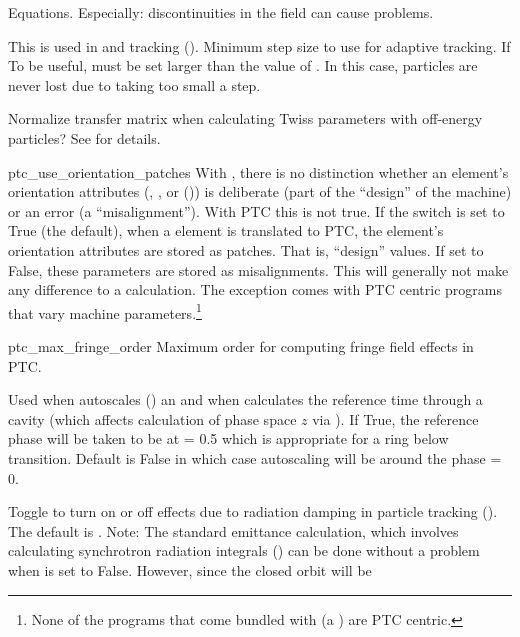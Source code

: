 {\begin{description}
Equations. Especially: discontinuities in the field can cause problems.
%
\item[\vn{min_ds_adaptive_tracking}] \Newline
This is used in  and  tracking (). Minimum step
size to use for adaptive tracking. If To be useful,  must be set
larger than the value of . In this case, particles are never lost
due to taking too small a step.
%
\item[\vn{normalize_twiss}] \Newline
Normalize transfer matrix when calculating Twiss parameters with off-energy particles?
See  for details.
%
\item{ptc_use_orientation_patches} \Newline
With \bmad, there is no distinction whether an element's orientation attributes (,
, or  ()) is deliberate (part of the ``design'' of the machine)
or an error (a ``misalignment'').  With PTC this is not true. If the 
switch is set to True (the default), when a \bmad element is translated to PTC,
the element's orientation attributes are stored as patches. That is, ``design'' values.
If set to False, these parameters are stored as misalignments. This will generally not make any
difference to a calculation. The exception comes with PTC centric programs that vary machine
parameters.\footnote
  {
None of the programs that come bundled with \bmad (a \bmad {}) are
PTC centric.
  }
%
\item{ptc_max_fringe_order} \Newline
Maximum order for computing fringe field effects in PTC. 
%
\item[\vn{rf_phase_below_transition_ref}] \Newline
Used when \bmad autoscales () an  and when \bmad calculates the
reference time through a cavity (which affects calculation of phase space $z$ via ).  If
True, the reference phase will be taken to be at  = 0.5 which is appropriate for a ring
below transition. Default is False in which case autoscaling will be around the phase  = 0.
%
\item[\vn{radiation_damping_on}] \Newline
Toggle to turn on or off effects due to radiation damping in particle tracking
(). The default is . Note: The standard \bmad emittance calculation,
which involves calculating synchrotron radiation integrals () can be done without
a problem when  is set to False. However, since the closed orbit will be

\end{description}}

